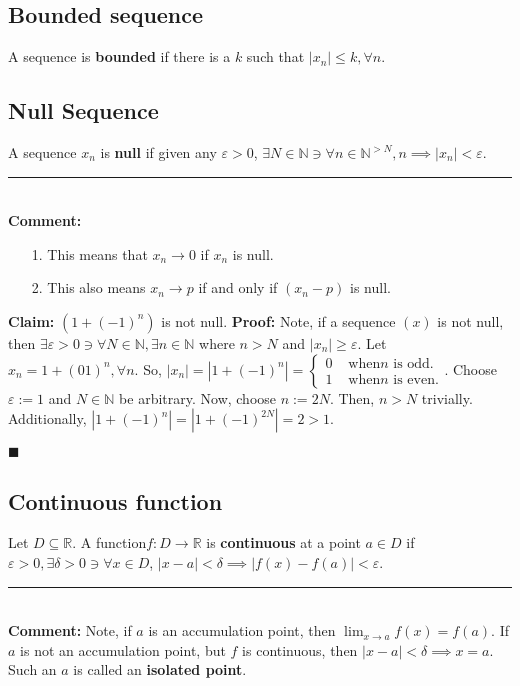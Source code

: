 \documentclass[11pt]{book}
\newcommand{\R}{\mathbb{R}}
\newcommand{\N}{\mathbb{N}}
\newcommand{\horline}{\noindent\rule{14.25cm}{0.6pt}\\}
\newcommand{\QED}{\begin{flushright}$\blacksquare$\end{flushright}}
\begin{document}
	\subsection{Bounded sequence}		
		\begin{defin}
			A sequence is \textbf{bounded} if there is a $k$ such that $|x_n| \leq k, \forall n$.
		\end{defin}
	\subsection{Null Sequence}
		\begin{defin}
			A sequence $x_n$ is \textbf{null} if given any $\varepsilon > 0$, $\exists N \in \N \ni \forall n \in \N^{>N}, n \implies |x_n| < \varepsilon$.\hfill\break
			\horline
			\textbf{Comment:}
				\begin{enumerate}
					\item[1.] This means that $x_n \to 0$ if $x_n$ is null.
					\item[2.] This also means $x_n \to p$ if and only if $(x_n - p)$ is null.
				\end{enumerate}
			
		\end{defin}
		\newpage
		\begin{examp}
			\textbf{Claim:} $(1 + (-1)^n)$ is not null.\hfill\break
			\textbf{Proof:} Note, if a sequence $(x)$ is not null, then $\exists \varepsilon > 0 \ni \forall N \in \N, \exists n \in \N$ where $n > N$ and $|x_n| \geq
			\varepsilon$. Let $x_n = 1 + (01)^n, \forall n$. So, $|x_n| = |1+(-1)^n| = \begin{cases} 0 & \text{ when} n \text{ is odd.}\\
				1 & \text{ when} n \text{ is even.}\end{cases}$. Choose $\varepsilon := 1$ and $N \in \N$ be arbitrary. Now, choose $n := 2N$. Then, 
				$n > N$ trivially. Additionally, $|1 + (-1)^n| = |1 + (-1)^{2N}| = 2 > 1$.
				\QED
		\end{examp}
	\subsection{Continuous function}
		\begin{defin}
			Let $D \subseteq \R$. A function$f: D \to \R$ is \textbf{continuous} at a point $a \in D$ if $\varepsilon > 0, \exists \delta > 0 \ni \forall x \in D$,
			$|x - a| < \delta \implies |f(x) - f(a)| < \varepsilon$.\hfill\break
			\horline
			\textbf{Comment:} Note, if $a$ is an accumulation point, then $\displaystyle\lim_{x \to a}{f(x) = f(a)}$. If $a$ is not an accumulation point,
			but $f$ is continuous, then $|x - a| < \delta \implies x = a$. Such an $a$ is called an \textbf{isolated point}.
		\end{defin}
\end{document}
